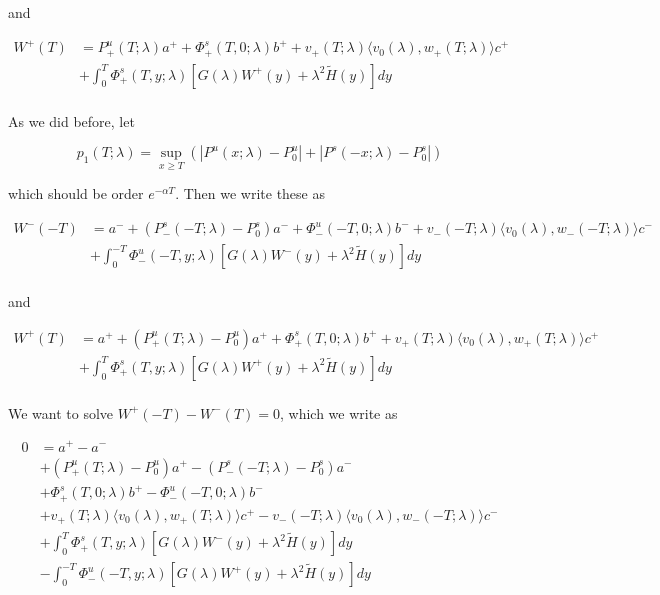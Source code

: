 \documentclass[12pt]{article}
\begin{document}
\begin{enumerate}
and

\begin{align*}
W^+(T) &= P^u_+(T; \lambda)a^+ + \Phi^s_+(T, 0; \lambda)b^+ + v_+(T; \lambda) \langle v_0(\lambda), w_+(T; \lambda) \rangle c^+ \\
&+ \int_0^T \Phi^s_+(T, y; \lambda) [ G(\lambda)W^+(y) + \lambda^2 \tilde{H}(y) ] dy \\
\end{align*}

As we did before, let

\[
p_1(T;\lambda) = \sup_{x \geq T} (|P^u(x;\lambda) - P_0^u| + |P^s(-x;\lambda) - P_0^s|)
\]

which should be order $e^{-\alpha T}$. Then we write these as

\begin{align*}
W^-(-T) &= a^- + (P^s_-(-T; \lambda) - P_0^s)a^- + \Phi^u_-(-T, 0; \lambda)b^- + v_-(-T; \lambda) \langle v_0(\lambda), w_-(-T; \lambda) \rangle c^-\\
&+ \int_0^{-T} \Phi^u_-(-T, y; \lambda)[ G(\lambda)W^-(y) + \lambda^2 \tilde{H}(y) ] dy \\
\end{align*}

and

\begin{align*}
W^+(T) &= a^+ + (P^u_+(T; \lambda) - P_0^u)a^+ + \Phi^s_+(T, 0; \lambda)b^+ + v_+(T; \lambda) \langle v_0(\lambda), w_+(T; \lambda) \rangle c^+ \\
&+ \int_0^T \Phi^s_+(T, y; \lambda) [ G(\lambda)W^+(y) + \lambda^2 \tilde{H}(y) ] dy \\
\end{align*}

We want to solve $W^+(-T) - W^-(T) = 0$, which we write as

\begin{align*}
0 &= a^+ - a^- \\
&+ (P^u_+(T; \lambda) - P_0^u)a^+ - (P^s_-(-T; \lambda) - P_0^s)a^- \\
&+ \Phi^s_+(T, 0; \lambda)b^+ - \Phi^u_-(-T, 0; \lambda)b^- \\
&+ v_+(T; \lambda) \langle v_0(\lambda), w_+(T; \lambda) \rangle c^+ - v_-(-T; \lambda) \langle v_0(\lambda), w_-(-T; \lambda) \rangle c^- \\
&+ \int_0^{T} \Phi^s_+(T, y; \lambda) [ G(\lambda)W^-(y) + \lambda^2 \tilde{H}(y) ] dy \\
&- \int_0^{-T} \Phi^u_-(-T, y; \lambda) [ G(\lambda)W^+(y) + \lambda^2 \tilde{H}(y) ] dy
\end{align*}


\end{enumerate}
\end{document}
